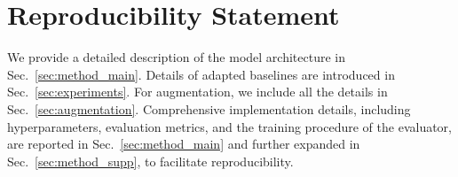 \section*{Reproducibility Statement}
We provide a detailed description of the model architecture in Sec.~\ref{sec:method_main}. Details of adapted baselines are introduced in Sec.~\ref{sec:experiments}. For augmentation, we include all the details in Sec.~\ref{sec:augmentation}. Comprehensive implementation details, including hyperparameters, evaluation metrics, and the training procedure of the evaluator, are reported in Sec.~\ref{sec:method_main} and further expanded in Sec.~\ref{sec:method_supp}, to facilitate reproducibility.


